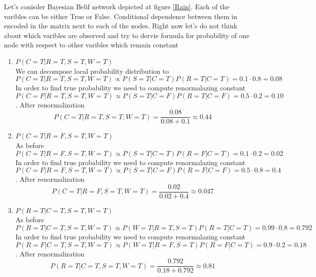 \documentclass[12pt,a4paper]{article}
\begin{document}
\hspace{1cm}\par Let's conisder Bayesian Belif network depicted at figure \ref{Rain}. Each of the varibles can be either True or False. Conditional dependence between them in encoded in the matrix next 
to each of the nodes. Right now let's do not think about which varibles are observed and try to dervie formula for probability of one node with respect to other varibles which remain constant
\begin{enumerate}
    \item {\Large \textbf{$P(C=T|R=T,S=T,W=T)$}}\\
    We can decompose local probability distribution to 
    \begin{equation*}
        P(C=T|R=T,S=T,W=T)\propto P(S=T|C=T)P(R=T|C=T)=0.1\cdot0.8=0.08
    \end{equation*}
    In order to find true probability we need to compute renormalazing constant
    \begin{equation*}
        P(C=F|R=T,S=T,W=T)\propto P(S=T|C=F)P(R=T|C=F)=0.5\cdot0.2=0.10
    \end{equation*}.
    After renormalization
    \begin{equation*}
        P(C=T|R=T,S=T,W=T)=\frac{0.08}{0.08+0.1}\approx0.44
    \end{equation*}

    \item{\Large \textbf{$P(C=T|R=F,S=T,W=T)$}}\\
    As before
    \begin{equation*}
        P(C=T|R=F,S=T,W=T)\propto P(S=T|C=T)P(R=F|C=T)=0.1\cdot0.2=0.02
    \end{equation*}
    In order to find true probability we need to compute renormalazing constant
    \begin{equation*}
        P(C=F|R=F,S=T,W=T)\propto P(S=T|C=F)P(R=F|C=F)=0.5\cdot0.8=0.4
    \end{equation*}.
    After renormalization
    \begin{equation*}
        P(C=T|R=F,S=T,W=T)=\frac{0.02}{0.02+0.4}\approx0.047
    \end{equation*}

    \item {\Large \textbf{$P(R=T|C=T,S=T,W=T)$}} \\
    As before
    \begin{equation*}
        P(R=T|C=T,S=T,W=T)\propto P(W=T|R=T,S=T)P(R=T|C=T)=0.99\cdot0.8=0.792
    \end{equation*}
    In order to find true probability we need to compute renormalazing constant
    \begin{equation*}
        P(R=F|C=T,S=T,W=T)\propto P(W=T|R=F,S=T)P(R=F|C=T)=0.9\cdot0.2=0.18
    \end{equation*}.
    After renormalization
    \begin{equation*}
        P(R=T|C=T,S=T,W=T)=\frac{0.792}{0.18+0.792}\approx0.81
    \end{equation*}


\end{enumerate}
\end{document}
